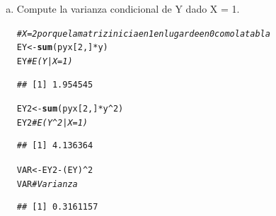 \documentclass{article}\usepackage[]{graphicx}\usepackage[]{color}
\makeatletter
\newcommand{\hlnum}[1]{\textcolor[rgb]{0.686,0.059,0.569}{#1}}%
\newcommand{\hlcom}[1]{\textcolor[rgb]{0.678,0.584,0.686}{\textit{#1}}}%
\newcommand{\hlopt}[1]{\textcolor[rgb]{0,0,0}{#1}}%
\newcommand{\hlstd}[1]{\textcolor[rgb]{0.345,0.345,0.345}{#1}}%
\newcommand{\hlkwb}[1]{\textcolor[rgb]{0.69,0.353,0.396}{#1}}%
\newcommand{\hlkwd}[1]{\textcolor[rgb]{0.737,0.353,0.396}{\textbf{#1}}}%
\newenvironment{kframe}{%
 \def\at@end@of@kframe{}%
 \ifinner\ifhmode%
  \def\at@end@of@kframe{\end{minipage}}%
  \begin{minipage}{\columnwidth}%
 \fi\fi%
 \def\FrameCommand##1{\hskip\@totalleftmargin \hskip-\fboxsep
 \colorbox{shadecolor}{##1}\hskip-\fboxsep
     \hskip-\linewidth \hskip-\@totalleftmargin \hskip\columnwidth}%
 \MakeFramed {\advance\hsize-\width
   \@totalleftmargin\z@ \linewidth\hsize
   \@setminipage}}%
 {\par\unskip\endMakeFramed%
 \at@end@of@kframe}
\newenvironment{knitrout}{}{} %
\makeatother
\begin{document}
\begin{enumerate}[(a)]
\item Compute la varianza condicional de Y dado X = 1.
\begin{knitrout}
\color{fgcolor}\begin{kframe}
\begin{alltt}
\hlcom{#X = 2 porque la matriz inicia en 1 en lugar de en 0 como la tabla}
\hlstd{EY}  \hlkwb{<-} \hlkwd{sum}\hlstd{(pyx[}\hlnum{2}\hlstd{,]}\hlopt{*}\hlstd{y)}
\hlstd{EY} \hlcom{#E(Y|X=1)}
\end{alltt}
\begin{verbatim}
## [1] 1.954545
\end{verbatim}
\begin{alltt}
\hlstd{EY2} \hlkwb{<-} \hlkwd{sum}\hlstd{(pyx[}\hlnum{2}\hlstd{,]}\hlopt{*}\hlstd{y}\hlopt{^}\hlnum{2}\hlstd{)}
\hlstd{EY2} \hlcom{#E(Y^2|X=1)}
\end{alltt}
\begin{verbatim}
## [1] 4.136364
\end{verbatim}
\begin{alltt}
\hlstd{VAR} \hlkwb{<-} \hlstd{EY2} \hlopt{-} \hlstd{(EY)}\hlopt{^}\hlnum{2}
\hlstd{VAR} \hlcom{#Varianza}
\end{alltt}
\begin{verbatim}
## [1] 0.3161157
\end{verbatim}
\end{kframe}
\end{knitrout}
\end{enumerate}
\end{document}
